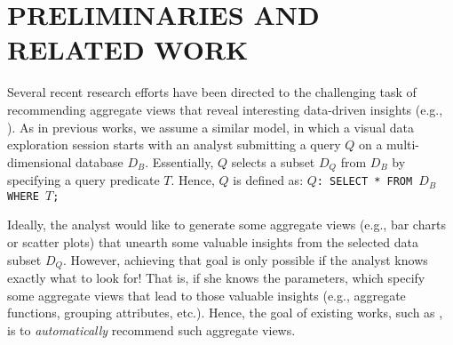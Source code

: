 
%
%
%

\section{PRELIMINARIES AND RELATED WORK}\label{sec:preliminaries_related_work}



Several recent research efforts have been directed to the challenging task of recommending aggregate views that reveal interesting data-driven insights (e.g., \cite{Vartak2014,Vartak2015,Ehsan2016}).
%
As in previous works, we assume a similar model, in which a visual data exploration session starts with an analyst submitting a query $Q$ on a multi-dimensional database $D_B$.
%
Essentially, $Q$ selects a subset $D_Q$ from $D_B$ by specifying a query predicate $T$.
%
Hence, $Q$ is  defined as:
%
{\tt $Q$: SELECT * FROM $D_B$ WHERE $T$;}



Ideally, the analyst would like to generate some aggregate views (e.g., bar charts or scatter plots) that unearth some valuable insights from the selected data subset $D_Q$. 
%
However, achieving that goal is only possible if the analyst knows exactly what to look for!  
%
That is, if she knows the parameters, which specify some aggregate views that lead to those valuable insights (e.g., aggregate functions, grouping attributes, etc.). 
%
%
Hence, the goal of existing works, such as \cite{Viegas2007,Key2012,Vartak2014,Vartak2015,Ehsan2016}, is to {\em automatically} recommend such aggregate views. 
%

